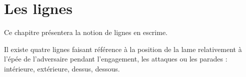 \chapter{Les lignes}\label{ch:lignes}

Ce chapitre présentera la notion de lignes en escrime.

Il existe quatre lignes faisant référence à la position de la lame relativement à l'épée de l'adversaire pendant l'engagement, les attaques ou les parades : intérieure, extérieure, dessus, dessous.